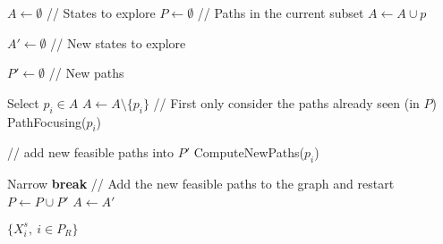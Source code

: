 \STATE $A \gets \emptyset$ // States to explore
\STATE $P \gets \emptyset$ // Paths in the current subset
	\STATE $A \gets A \cup p$
\ENDFOR

\STATE $A' \gets \emptyset$ // New states to explore

\STATE $P' \gets \emptyset$ // New paths

	\STATE Select $p_i \in A$
	\STATE $A \gets A \setminus \{p_i\}$
	\STATE // First only consider the paths already seen (in $P$)
	\STATE PathFocusing($p_i$)
	
	\STATE // add new feasible paths into $P'$
	\STATE ComputeNewPaths($p_i$)

\ENDWHILE
\STATE Narrow
	\STATE \textbf{break}
\ENDIF
\STATE // Add the new feasible paths to the graph and restart 
\STATE $P \gets P \cup P'$
\STATE $A \gets A'$
\ENDWHILE

\STATE \RETURN $\{X_i^s,\ i \in P_R\}$

